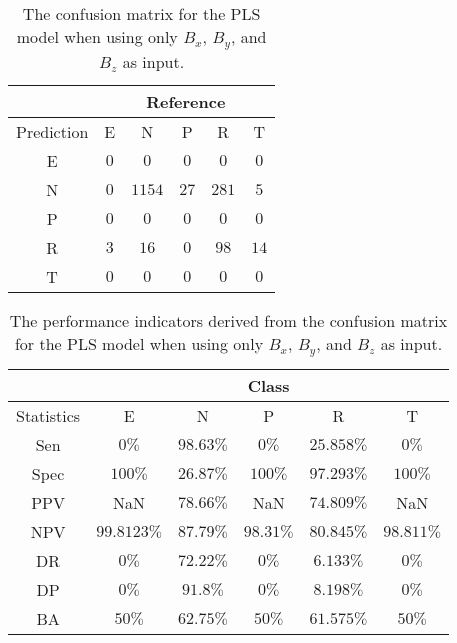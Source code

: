 \begin{table}[!ht]
	\centering
	\begin{tabular}{|c|c|c|c|c|c|}
		\hline
		 & \multicolumn{5}{|c|}{Reference} \\ \hline
		 Prediction & E & N & P & R & T \\ \hline
		 E & $0$ & $0$ & $0$ & $0$ & $0$ \\ \hline
		 N & $0$ & $1154$ & $27$ & $281$ & $5$ \\ \hline
		 P & $0$ & $0$ & $0$ & $0$ & $0$ \\ \hline
		 R & $3$ & $16$ & $0$ & $98$ & $14$ \\ \hline
		 T & $0$ & $0$ & $0$ & $0$ & $0$ \\ \hline
	\end{tabular}
	\caption{The confusion matrix for the PLS model when using only $B_{x}$, $B_{y}$, and $B_{z}$ as input.}
	\label{tab:cm:coord:pls}
\end{table}

\begin{table}[!ht]
	\centering
	\begin{tabular}{|c|c|c|c|c|c|}
		\hline
		 & \multicolumn{5}{c|}{Class} \\ \hline
		Statistics & E & N & P & R & T \\ \hline
		Sen & $0\%$ & $98.63\%$ & $0\%$ & $25.858\%$ & $0\%$ \\ \hline
		Spec & $100\%$ & $26.87\%$ & $100\%$ & $97.293\%$ & $100\%$ \\ \hline
		PPV & NaN & $78.66\%$ & NaN & $74.809\%$ & NaN \\ \hline
		NPV & $99.8123\%$ & $87.79\%$ & $98.31\%$ & $80.845\%$ & $98.811\%$ \\ \hline
		DR & $0\%$ & $72.22\%$ & $0\%$ & $6.133\%$ & $0\%$ \\ \hline
		DP & $0\%$ & $91.8\%$ & $0\%$ & $8.198\%$ & $0\%$ \\ \hline
		BA & $50\%$ & $62.75\%$ & $50\%$ & $61.575\%$ & $50\%$ \\ \hline
	\end{tabular}
	\caption{The performance indicators derived from the confusion matrix for the PLS model when using only $B_{x}$, $B_{y}$, and $B_{z}$ as input.}
	\label{tab:cs:reverse:coord:pls}
\end{table}
